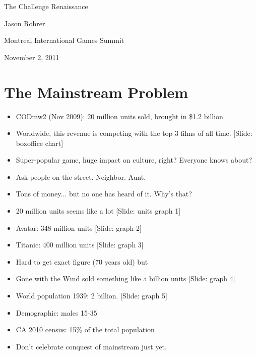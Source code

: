\documentclass[12pt]{article}
\begin{document}
\begin{center}
The Challenge Renaissance

Jason Rohrer

Montreal International Games Summit

November 2, 2011
\end{center}


\section{The Mainstream Problem}
{\Huge



\begin{itemize}


\item CODmw2 (Nov 2009): 20 million units sold, brought in \$1.2 billion

\item Worldwide, this revenue is competing with the top 3 films of all time. [Slide: boxoffice chart]

\item Super-popular game, huge impact on culture, right?  Everyone knows about?

\item  Ask people on the street.  Neighbor.  Aunt.

\item Tons of money... but no one has heard of it.  Why's that? 

\item 20 million units seems like a lot [Slide:  units graph 1]

\item Avatar: 348 million units [Slide: graph 2]

\item Titanic: 400 million units  [Slide: graph 3]

\item Hard to get exact figure (70 years old) but

\item Gone with the Wind sold something like a billion units [Slide: graph 4] 


\item World population 1939: 2 billion. [Slide: graph 5] 


\item Demographic:  males 15-35
\item CA 2010 census:  15\% of the total population


\item Don't celebrate conquest of mainstream just yet.


\end{itemize}}
\end{document}
